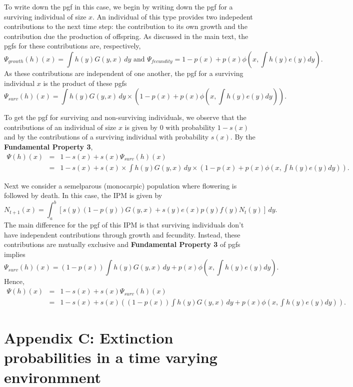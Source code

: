 \documentclass[12pt]{amsart}\usepackage[]{graphicx}\usepackage[]{color}
\begin{document}
To write down the pgf in this case, we begin by writing down the pgf for a surviving individual of size $x$. An individual of this type provides two indepedent contributions to the next time step: the contribution to its own growth and the contribution due the production of offspring. As discussed in the main text, the pgfs for these contributions are, respectively, 
\[
\Psi_{growth}(h)(x)=\int h(y) G(y,x)\,dy \mbox{ and } \Psi_{fecundity}=1-p(x)+p(x)\phi(x,\int h(y)e(y)dy).
\]
As these contributions are independent of one another, the pgf for a surviving individual $x$ is the product of these pgfs 
\[
\Psi_{surv}(h)(x)=\int h(y) G(y,x)\,dy \times \left(1-p(x)+p(x)\phi(x,\int h(y)e(y)dy)\right). 
\]

To get the pgf for surviving and non-surviving individuals, we observe that the contributions of an individual of size $x$ is given by $0$ with probability $1-s(x)$ and by the contributions of a surviving individual with probability $s(x)$. By the \textbf{Fundamental Property 3}, 
\begin{eqnarray*}
\Psi (h)(x)&=&1-s(x)+s(x)\Psi_{surv}(h)(x)\\
&=& 1-s(x)+s(x)\times \int h(y) G(y,x)\,dy \times \left(1-p(x)+p(x)\phi(x,\int h(y)e(y)dy)\right).
\end{eqnarray*}

Next we consider a semelparous (monocarpic) population where flowering is followed by death. In this case, the IPM is given by 
\[
N_{t+1}(x)=\int_a^b \left[ s(y)(1-p(y))G(y, x)+s(y)e(x)p(y)f(y)N_t(y)\right]\, dy.
\]
The main difference for the pgf of this IPM is that surviving individuals don't have independent contributions through growth and fecundity. Instead, these contributions are mutually exclusive and \textbf{Fundamental Property 3} of pgfs implies 
\[
\Psi_{surv}(h)(x)=(1-p(x))\int h(y) G(y,x)\,dy +p(x)\phi(x,\int h(y)e(y)dy). 
\]
Hence, 
\begin{eqnarray*}
\Psi (h)(x)&=&1-s(x)+s(x)\Psi_{surv}(h)(x)\\
&=& 1-s(x) + s(x)\left((1-p(x))\int h(y) G(y,x)\,dy +p(x)\phi(x,\int h(y)e(y)dy)\right). 
\end{eqnarray*}

\newpage

\section*{Appendix C: Extinction probabilities in a time varying environmnent}
\end{document}
